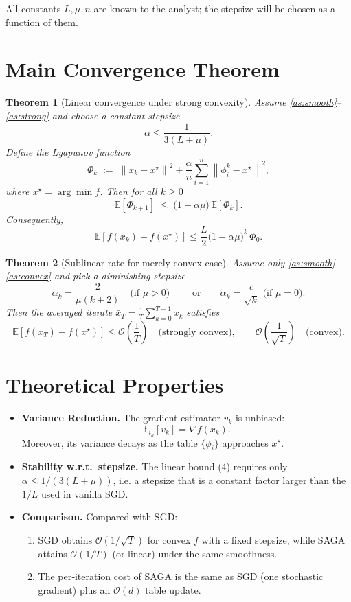 \documentclass{article}
\newcommand{\E}{\mathbb{E}}
\newcommand{\norm}[1]{\left\|#1\right\|}
\newtheorem{theorem}{Theorem}
\begin{document}
All constants $L,\mu,n$ are known to the analyst; the stepsize will be chosen as a function of them.

\section*{Main Convergence Theorem}
\begin{theorem}[Linear convergence under strong convexity]\label{thm:strong}
Assume \ref{as:smooth}–\ref{as:strong} and choose a constant stepsize
\[
\alpha \le \frac{1}{3(L+\mu)} .
\]
Define the Lyapunov function
\[
\Phi_k \;:=\; \norm{x_k-x^{\star}}^{2}
      + \frac{\alpha}{n}\sum_{i=1}^{n}\norm{\phi_i^{k}-x^{\star}}^{2},
\]
where $x^{\star}=\arg\min f$.
Then for all $k\ge 0$
\[
\E[\Phi_{k+1}] \;\le\; \bigl(1-\alpha\mu\bigr)\,\E[\Phi_k].
\tag{4}
\]
Consequently,
\[
\E\!\left[f(x_k)-f(x^{\star})\right]\le
\frac{L}{2}\bigl(1-\alpha\mu\bigr)^{k}\,\Phi_0 .
\tag{5}
\]
\end{theorem}
\begin{theorem}[Sublinear rate for merely convex case]\label{thm:convex}
Assume only \ref{as:smooth}–\ref{as:convex} and pick a diminishing stepsize
\[
\alpha_k = \frac{2}{\mu(k+2)}\quad\text{(if $\mu>0$) }\qquad 
\text{or}\qquad 
\alpha_k=\frac{c}{\sqrt{k}} \text{ (if $\mu=0$)} .
\]
Then the averaged iterate $\bar x_T=\frac1T\sum_{k=0}^{T-1}x_k$ satisfies
\[
\E\!\left[f(\bar x_T)-f(x^{\star})\right]\le
\mathcal O\!\left(\frac{1}{T}\right)\quad\text{(strongly convex)},
\qquad
\mathcal O\!\left(\frac{1}{\sqrt{T}}\right)\quad\text{(convex)} .
\]
\end{theorem}

\section*{Theoretical Properties}
\begin{itemize}
\item \textbf{Variance Reduction.} The gradient estimator $v_k$ is unbiased:
\[
\E_{i_k}[v_k]=\nabla f(x_k) .
\tag{6}
\]
Moreover, its variance decays as the table $\{\phi_i\}$ approaches $x^{\star}$.

\item \textbf{Stability w.r.t.\ stepsize.} The linear bound (4) requires only $\alpha\le 1/(3(L+\mu))$, i.e. a stepsize that is a constant factor larger than the $1/L$ used in vanilla SGD.

\item \textbf{Comparison.} Compared with SGD:
\begin{enumerate}[label=(\alph*)]
\item SGD obtains $\mathcal O(1/\sqrt{T})$ for convex $f$ with a fixed stepsize, while SAGA attains $\mathcal O(1/T)$ (or linear) under the same smoothness.
\item The per‑iteration cost of SAGA is the same as SGD (one stochastic gradient) plus an $\mathcal O(d)$ table update.
\end{enumerate}
\end{itemize}
\end{document}

